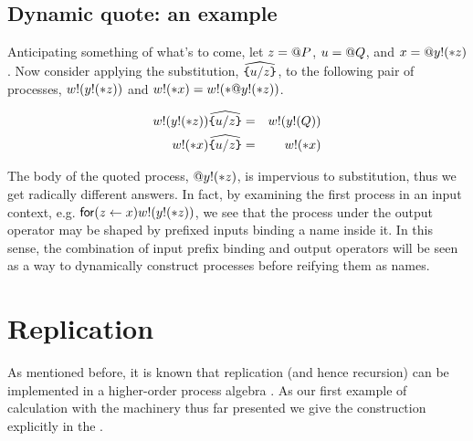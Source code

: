 


\subsection{ Dynamic quote: an example }

Anticipating something of what's to come, let $z = \mathsf{@} P$, $u = \mathsf{@} Q$, and $x = \mathsf{@} y \mathsf{!}(\mathsf{*} z)$. Now consider applying the substitution,
$\widehat{\texttt{\{}u / z \texttt{\}}}$, to the following pair of processes,
$w \mathsf{!}(y!(\mathsf{*} z))$ and $w \mathsf{!}(\mathsf{*} x) = w \mathsf{!}(\mathsf{*} \mathsf{@} y \mathsf{!}(\mathsf{*} z))$.

\begin{eqnarray}
	w \mathsf{!}(y \mathsf{!}(\mathsf{*} z))\widehat{\texttt{\{}u / z \texttt{\}}}
		& = &
		w \mathsf{!}(y \mathsf{!}(Q)) \nonumber\\
	w \mathsf{!}(\mathsf{*} x) \widehat{ \texttt{\{}u / z \texttt{\}} }
		& = &
		w \mathsf{!}(\mathsf{*} x) \nonumber
\end{eqnarray}

The body of the quoted process, $\mathsf{@} y \mathsf{!}(\mathsf{*} z)$, is
impervious to substitution, thus we get radically different
answers. In fact, by examining the first process in an input context,
e.g. $\mathsf{for}(z \leftarrow x)w \mathsf{!}(y \mathsf{!}(\mathsf{*} z))$, we see that the process
under the output operator may be shaped by prefixed inputs binding a
name inside it. In this sense, the combination of input prefix binding
and output operators will be seen as a way to dynamically construct
processes before reifying them as names.

\section{Replication}

As mentioned before, it is known that replication (and hence
recursion) can be implemented in a higher-order process algebra
\cite{DBLP:books/daglib/0004377}. As our first example of calculation with the
machinery thus far presented we give the construction explicitly in
the {\rhoc}.

